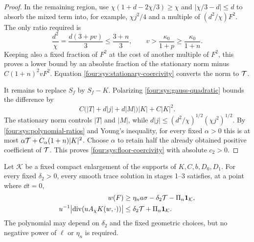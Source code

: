 \begin{proof}
In the remaining region, use
$\chi(1+d-2\chi/3)\ge\chi$ and $|\chi/3-d|\le d$ to absorb the
mixed term into, for example, $\chi j^2/4$ and a multiple of
$(d^2/\chi)F^2$.  The only ratio required is
\begin{equation}\label{four:sys:polynomial-ratios}
 \frac{d^2}{\chi}=\frac{d(3+pv)}3\le\frac{3+n}{3},\qquad
 v>\frac{\kappa_0}{1+p}\ge\frac{\kappa_0}{1+n}.
\end{equation}
Keeping also a fixed fraction of $F^2$ at the cost of another multiple
of $F^2$, this proves a lower bound by an absolute fraction of the
stationary norm minus $C(1+n)^2vF^2$.  Equation
\eqref{four:sys:stationary-coercivity} converts the norm to $\mathcal T$.

It remains to replace $S_f$ by $S_f-K$.  Polarizing
\eqref{four:sys:gauss-quadratic} bounds the difference by
\[
 C\bigl(|T|+d|j|+d|M|\bigr)|K|+C|K|^2.
\]
The stationary norm controls $|T|$ and $|M|$, while
$d|j|\le(d^2/\chi)^{1/2}(\chi j^2)^{1/2}$.
By \eqref{four:sys:polynomial-ratios} and Young's inequality, for every
fixed $\alpha>0$ this is at most
$\alpha\mathcal T+C_\alpha(1+n)|K|^2$.  Choose $\alpha$ to retain half
the already obtained positive coefficient of $\mathcal T$.  This proves
\eqref{four:sys:floor-coercivity} with absolute $c_2>0$.
\end{proof}

\begin{lemma}
\label{four:sys:stationary-errors}
Let $\mathcal K$ be a fixed compact enlargement of the supports of
$K,C,b,D_0,D_1$.  For every fixed $\delta_2>0$, every smooth trace
solution in stages 1--3 satisfies, at a point where $\dd t=0$,
\begin{equation}\label{four:sys:derivative-errors}
\begin{aligned}
 w(F)&\ge\eta_n a\sigma-\delta_2\mathcal T-\Pi_n\mathbf1_{\mathcal K},\\
 u^{-1}\bigl|\operatorname{div}(uA_\chi K(w,\cdot))\bigr|
   &\le\delta_2\mathcal T+\Pi_n\mathbf1_{\mathcal K}.
\end{aligned}
\end{equation}
The polynomial may depend on $\delta_2$ and the fixed geometric choices,
but no negative power of $\ell$ or $\eta_n$ is required.
\end{lemma}

